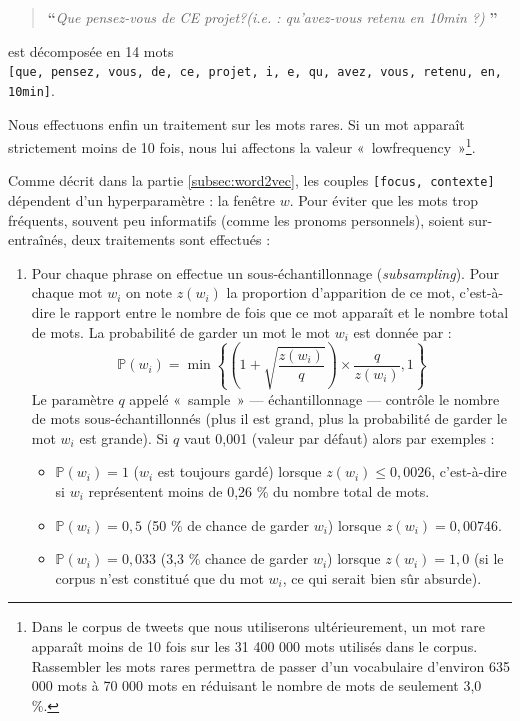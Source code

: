\documentclass[11pt,french,french]{article}
\providecommand{\tightlist}{%
  \setlength{\parskip}{0pt}
  }
\let\rmarkdownfootnote\footnote%
\def\footnote{\protect\rmarkdownfootnote}
\begin{document}
\begin{quote}
\LARGE \textbf{``}\normalsize \emph{Que pensez-vous de CE projet?(i.e. : qu'avez-vous retenu en 10min ?)} \LARGE \textbf{''}\normalsize
\end{quote}

est décomposée en 14 mots \texttt{{[}que,\ pensez,\ vous,\ de,\ ce,\ projet,\ i,\ e,\ qu,\ avez,\ vous,\ retenu,\ en,\ 10min{]}}.

Nous effectuons enfin un traitement sur les mots rares. Si un mot apparaît strictement moins de 10 fois, nous lui affectons la valeur «~lowfrequency~»\footnote{Dans le corpus de tweets que nous utiliserons ultérieurement, un mot rare apparaît moins de 10 fois sur les 31 400 000 mots utilisés dans le corpus. Rassembler les mots rares permettra de passer d'un vocabulaire d'environ 635 000 mots à 70 000 mots en réduisant le nombre de mots de seulement 3,0 \%.}.

Comme décrit dans la partie \ref{subsec:word2vec}, les couples \texttt{{[}focus,\ contexte{]}} dépendent d'un hyperparamètre : la fenêtre \(w\). Pour éviter que les mots trop fréquents, souvent peu informatifs (comme les pronoms personnels), soient sur-entraînés, deux traitements sont effectués :

\begin{enumerate}
\def\labelenumi{\arabic{enumi}.}
\item
  Pour chaque phrase on effectue un sous-échantillonnage (\emph{subsampling}). Pour chaque mot \(w_i\) on note \(z(w_i)\) la proportion d'apparition de ce mot, c'est-à-dire le rapport entre le nombre de fois que ce mot apparaît et le nombre total de mots. La probabilité de garder un mot le mot \(w_i\) est donnée par :
  \[
  \mathbb P(w_i) = \min\left\{\left(1+\sqrt{\frac{z(w_i)}{q}}  \right)
  \times
  \frac{q}{z(w_i)},1\right\}
  \]
  Le paramètre \(q\) appelé «~sample~» --- échantillonnage --- contrôle le nombre de mots sous-échantillonnés (plus il est grand, plus la probabilité de garder le mot \(w_i\) est grande). Si \(q\) vaut 0,001 (valeur par défaut) alors par exemples :

  \begin{itemize}
  \tightlist
  \item
    \(\mathbb P(w_i) = 1\) (\(w_i\) est toujours gardé) lorsque \(z(w_i)\leq 0,0026\), c'est-à-dire si \(w_i\) représentent moins de 0,26 \% du nombre total de mots.\\
  \item
    \(\mathbb P(w_i) = 0,5\) (50 \% de chance de garder \(w_i\)) lorsque \(z(w_i)=0,00746\).\\
  \item
    \(\mathbb P(w_i) = 0,033\) (3,3 \% chance de garder \(w_i\)) lorsque \(z(w_i)=1,0\) (si le corpus n'est constitué que du mot \(w_i\), ce qui serait bien sûr absurde).
  \end{itemize}
\end{enumerate}
\end{document}
